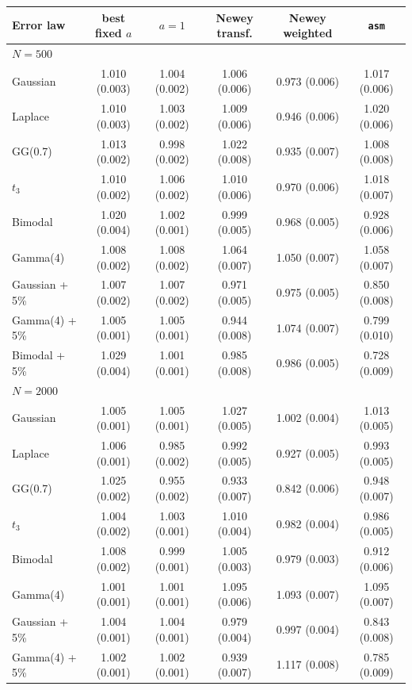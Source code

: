 \begin{tabular}{lccccc}
\toprule
Error law & best fixed $a$ & $a=1$ & Newey transf. & Newey weighted & \texttt{asm} \\
\midrule
\multicolumn{6}{l}{\emph{$N=500$}} \\
Gaussian & 1.010 (0.003) & 1.004 (0.002) & 1.006 (0.006) & 0.973 (0.006) & 1.017 (0.006) \\
Laplace & 1.010 (0.003) & 1.003 (0.002) & 1.009 (0.006) & 0.946 (0.006) & 1.020 (0.006) \\
GG(0.7) & 1.013 (0.002) & 0.998 (0.002) & 1.022 (0.008) & 0.935 (0.007) & 1.008 (0.008) \\
$t_3$ & 1.010 (0.002) & 1.006 (0.002) & 1.010 (0.006) & 0.970 (0.006) & 1.018 (0.007) \\
Bimodal & 1.020 (0.004) & 1.002 (0.001) & 0.999 (0.005) & 0.968 (0.005) & 0.928 (0.006) \\
Gamma(4) & 1.008 (0.002) & 1.008 (0.002) & 1.064 (0.007) & 1.050 (0.007) & 1.058 (0.007) \\
Gaussian + 5\% & 1.007 (0.002) & 1.007 (0.002) & 0.971 (0.005) & 0.975 (0.005) & 0.850 (0.008) \\
Gamma(4) + 5\% & 1.005 (0.001) & 1.005 (0.001) & 0.944 (0.008) & 1.074 (0.007) & 0.799 (0.010) \\
Bimodal + 5\% & 1.029 (0.004) & 1.001 (0.001) & 0.985 (0.008) & 0.986 (0.005) & 0.728 (0.009) \\
\multicolumn{6}{l}{\emph{$N=2000$}} \\
Gaussian & 1.005 (0.001) & 1.005 (0.001) & 1.027 (0.005) & 1.002 (0.004) & 1.013 (0.005) \\
Laplace & 1.006 (0.001) & 0.985 (0.002) & 0.992 (0.005) & 0.927 (0.005) & 0.993 (0.005) \\
GG(0.7) & 1.025 (0.002) & 0.955 (0.002) & 0.933 (0.007) & 0.842 (0.006) & 0.948 (0.007) \\
$t_3$ & 1.004 (0.002) & 1.003 (0.001) & 1.010 (0.004) & 0.982 (0.004) & 0.986 (0.005) \\
Bimodal & 1.008 (0.002) & 0.999 (0.001) & 1.005 (0.003) & 0.979 (0.003) & 0.912 (0.006) \\
Gamma(4) & 1.001 (0.001) & 1.001 (0.001) & 1.095 (0.006) & 1.093 (0.007) & 1.095 (0.007) \\
Gaussian + 5\% & 1.004 (0.001) & 1.004 (0.001) & 0.979 (0.004) & 0.997 (0.004) & 0.843 (0.008) \\
Gamma(4) + 5\% & 1.002 (0.001) & 1.002 (0.001) & 0.939 (0.007) & 1.117 (0.008) & 0.785 (0.009) \\

\end{tabular}
